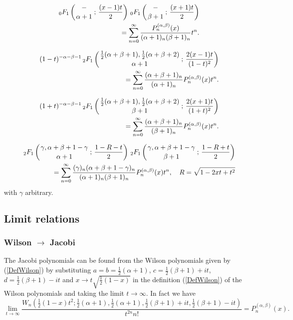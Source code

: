 \documentclass[envcountchap,graybox]{svmono}
\newcounter{rom}
\newcommand{\hyp}[5]{\mbox{}_{#1}{F}_{#2}
\left(\genfrac{}{}{0pt}{}{#3}{#4}\,;\,#5\right)}
\begin{document}
\begin{eqnarray}
\label{GenJacobi2}
& &\hyp{0}{1}{-}{\alpha+1}{\frac{(x-1)t}{2}}\,\hyp{0}{1}{-}{\beta+1}{\frac{(x+1)t}{2}}\nonumber\\
& &{}=\sum_{n=0}^{\infty}\frac{P_n^{(\alpha,\beta)}(x)}{(\alpha+1)_n(\beta+1)_n}t^n.
\end{eqnarray}

\begin{eqnarray}
\label{GenJacobi3}
& &(1-t)^{-\alpha-\beta-1}\,\hyp{2}{1}{\frac{1}{2}(\alpha+\beta+1),\frac{1}{2}(\alpha+\beta+2)}
{\alpha+1}{\frac{2(x-1)t}{(1-t)^2}}\nonumber\\
& &{}=\sum_{n=0}^{\infty}\frac{(\alpha+\beta+1)_n}{(\alpha+1)_n}P_n^{(\alpha,\beta)}(x)t^n.
\end{eqnarray}

\begin{eqnarray}
\label{GenJacobi4}
& &(1+t)^{-\alpha-\beta-1}\,\hyp{2}{1}{\frac{1}{2}(\alpha+\beta+1),\frac{1}{2}(\alpha+\beta+2)}
{\beta+1}{\frac{2(x+1)t}{(1+t)^2}}\nonumber\\
& &{}=\sum_{n=0}^{\infty}\frac{(\alpha+\beta+1)_n}{(\beta+1)_n}P_n^{(\alpha,\beta)}(x)t^n.
\end{eqnarray}

\begin{eqnarray}
\label{GenJacobi5}
& &\hyp{2}{1}{\gamma,\alpha+\beta+1-\gamma}{\alpha+1}{\frac{1-R-t}{2}}\,
\hyp{2}{1}{\gamma,\alpha+\beta+1-\gamma}{\beta+1}{\frac{1-R+t}{2}}\nonumber\\
& &{}=\sum_{n=0}^{\infty}
\frac{(\gamma)_n(\alpha+\beta+1-\gamma)_n}{(\alpha+1)_n(\beta+1)_n}P_n^{(\alpha,\beta)}(x)t^n,
\quad R=\sqrt{1-2xt+t^2}
\end{eqnarray}
with $\gamma$ arbitrary.

\subsection*{Limit relations}

\subsubsection*{Wilson $\rightarrow$ Jacobi}
The Jacobi polynomials can be found from the Wilson polynomials given by (\ref{DefWilson}) by
substituting $a=b=\frac{1}{2}(\alpha+1)$, $c=\frac{1}{2}(\beta+1)+it$,
$d=\frac{1}{2}(\beta+1)-it$ and $x\rightarrow t\sqrt{\frac{1}{2}(1-x)}$ in the
definition (\ref{DefWilson}) of the Wilson polynomials and taking the limit
$t\rightarrow\infty$. In fact we have
$$\lim_{t\rightarrow\infty}
\frac{W_n(\frac{1}{2}(1-x)t^2;\frac{1}{2}(\alpha+1),
\frac{1}{2}(\alpha+1),\frac{1}{2}(\beta+1)+it,\frac{1}{2}(\beta+1)-it)}
{t^{2n}n!}=P_n^{(\alpha,\beta)}(x).$$
\end{document}
